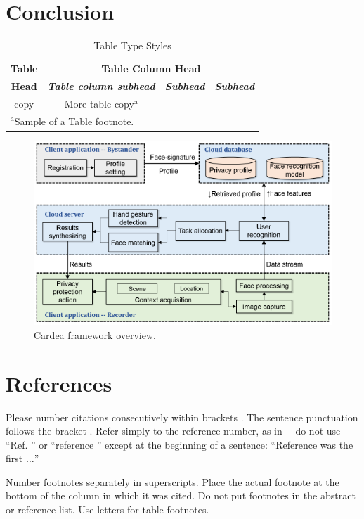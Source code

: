 \documentclass[conference]{IEEEtran}
\begin{document}
\section{Conclusion}


\begin{table}[htbp]
\caption{Table Type Styles}
\begin{center}
\begin{tabular}{|c|c|c|c|}
\hline
\textbf{Table}&\multicolumn{3}{|c|}{\textbf{Table Column Head}} \\
\cline{2-4} 
\textbf{Head} & \textbf{\textit{Table column subhead}}& \textbf{\textit{Subhead}}& \textbf{\textit{Subhead}} \\
\hline
copy& More table copy$^{\mathrm{a}}$& &  \\
\hline
\multicolumn{4}{l}{$^{\mathrm{a}}$Sample of a Table footnote.}
\end{tabular}
\label{tab1}
\end{center}
\end{table}

\begin{figure}[t]
\centerline{\includegraphics[width=.5\textwidth]{img/cardea_overview_diagram.png}}
\caption{Cardea framework overview.}
\label{fig}
\end{figure}


\section*{References}

Please number citations consecutively within brackets \cite{shu2016cardea}. The 
sentence punctuation follows the bracket \cite{dufaux2010framework}. Refer simply to the reference 
number, as in \cite{denning2014situ}---do not use ``Ref. \cite{denning2014situ}'' or ``reference \cite{denning2014situ}'' except at 
the beginning of a sentence: ``Reference \cite{lu2017privacy} was the first $\ldots$''

Number footnotes separately in superscripts.\cite{chinomi2008PriSurv} Place the actual footnote at 
the bottom of the column in which it was cited. Do not put footnotes in the 
abstract or reference list. Use letters for table footnotes.
\end{document}
